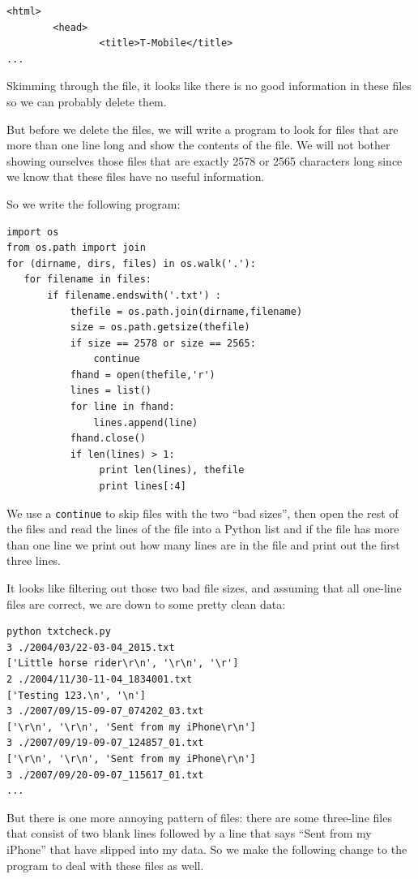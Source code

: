 \documentclass[10pt]{book}
\begin{document}
\beforeverb
\begin{verbatim}
<html>
        <head>
                <title>T-Mobile</title>
...
\end{verbatim}
\afterverb
%
Skimming through the file, it looks like there is no good information
in these files so we can probably delete them.

But before we delete the files, we will write a program to look for files
that are more than one line long and show the contents of the file.
We will not bother showing ourselves those files that are exactly
2578 or 2565 characters long since we know that these files have no useful
information.

So we write the following program:
\beforeverb
\begin{verbatim}
import os
from os.path import join
for (dirname, dirs, files) in os.walk('.'):
   for filename in files:
       if filename.endswith('.txt') :
           thefile = os.path.join(dirname,filename)
           size = os.path.getsize(thefile)
           if size == 2578 or size == 2565:
               continue
           fhand = open(thefile,'r')
           lines = list()
           for line in fhand:
               lines.append(line)
           fhand.close()
           if len(lines) > 1:
                print len(lines), thefile
                print lines[:4]
\end{verbatim}
\afterverb
%
We use a {\tt continue} to skip files with the two 
``bad sizes'', then open the rest of the files
and read the lines of the file into a Python list
and if the file has more than one line we print
out how many lines are in the file and print out
the first three lines.

It looks like filtering out those two bad file sizes, and assuming
that all one-line files are correct, we are down to some pretty clean
data:

\beforeverb
\begin{verbatim}
python txtcheck.py 
3 ./2004/03/22-03-04_2015.txt
['Little horse rider\r\n', '\r\n', '\r']
2 ./2004/11/30-11-04_1834001.txt
['Testing 123.\n', '\n']
3 ./2007/09/15-09-07_074202_03.txt
['\r\n', '\r\n', 'Sent from my iPhone\r\n']
3 ./2007/09/19-09-07_124857_01.txt
['\r\n', '\r\n', 'Sent from my iPhone\r\n']
3 ./2007/09/20-09-07_115617_01.txt
...
\end{verbatim}
\afterverb
%
But there is one more annoying pattern of files: 
there are some three-line files that consist of
two blank lines followed by a line that says
``Sent from my iPhone'' that have slipped 
into my data.   So we make the following change
to the program to deal with these files as well.
\end{document}
